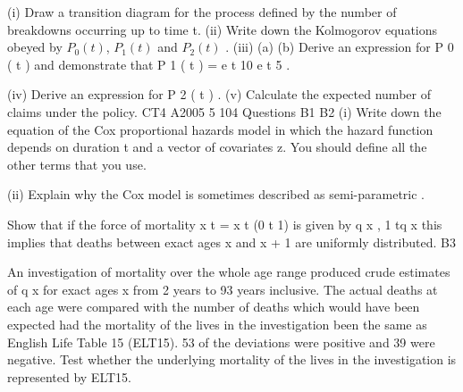 \documentclass[a4paper,12pt]{article}
\begin{document}
\begin{enumerate}
(i)
Draw a transition diagram for the process defined by the number of breakdowns occurring up to time t.
(ii) Write down the Kolmogorov equations obeyed by $P_0 ( t )$, $P_1 ( t )$ and $P_2 ( t )$ .
(iii) (a)
(b)
Derive an expression for P 0 ( t ) and
demonstrate that P 1 ( t ) = e
t
10
e
t
5 .

(iv) Derive an expression for P 2 ( t ) .
(v) Calculate the expected number of claims under the policy.
CT4 A2005
5
104 Questions
B1
B2
(i) Write down the equation of the Cox proportional hazards model in which the hazard function depends on duration t and a vector of covariates z. You should define all the other terms that you use.

(ii) Explain why the Cox model is sometimes described as semi-parametric . 

Show that if the force of mortality
x t
=
x t
(0
t
1) is given by
q x
,
1 tq x
this implies that deaths between exact ages x and x + 1 are uniformly distributed.
B3

An investigation of mortality over the whole age range produced crude estimates of q x for exact ages x from 2 years to 93 years inclusive. The actual deaths at each age were compared with the number of deaths which would have been expected had the
mortality of the lives in the investigation been the same as English Life Table 15 (ELT15). 53 of the deviations were positive and 39 were negative.
Test whether the underlying mortality of the lives in the investigation is represented
by ELT15.




\end{enumerate}
\end{document}

